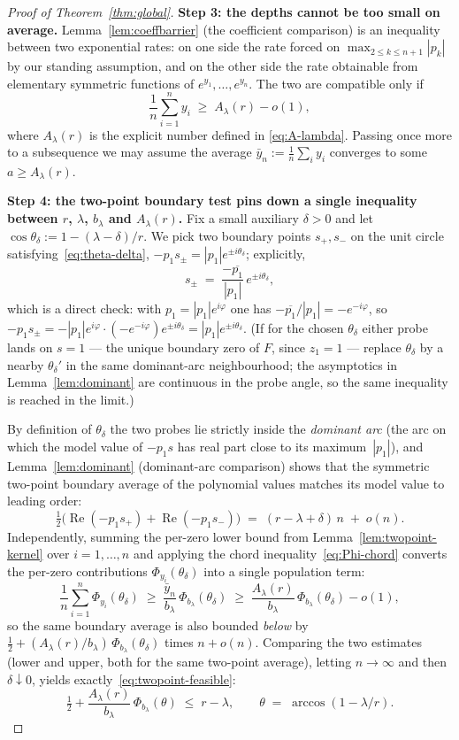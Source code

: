 \documentclass[11pt]{article}
\DeclareMathOperator{\Repart}{Re}
\begin{document}
\begin{proof}[Proof of Theorem~\ref{thm:global}]
\medskip
\noindent\textbf{Step 3: the depths cannot be too small on average.}
Lemma~\ref{lem:coeffbarrier} (the coefficient comparison) is an inequality
between two exponential rates: on one side the rate forced on
$\max_{2\leq k\leq n+1}|p_k|$ by our standing assumption, and on the other
side the rate obtainable from elementary symmetric functions of
$e^{y_1},\dots,e^{y_n}$. The two are compatible only if
\[
        \frac{1}{n}\sum_{i=1}^n y_i\;\geq\; A_\lambda(r)-o(1),
\]
where $A_\lambda(r)$ is the explicit number defined in
\eqref{eq:A-lambda}. Passing once more to a subsequence we may assume the
average $\bar y_n:=\tfrac1n\sum_i y_i$ converges to some $a\geq
A_\lambda(r)$.

\medskip
\noindent\textbf{Step 4: the two-point boundary test pins down a single
inequality between $r$, $\lambda$, $b_\lambda$ and $A_\lambda(r)$.}
Fix a small auxiliary $\delta>0$ and let
$\cos\theta_\delta:=1-(\lambda-\delta)/r$. We pick two boundary points
$s_+,s_-$ on the unit circle satisfying~\eqref{eq:theta-delta},
\(-p_1 s_\pm=|p_1|e^{\pm i\theta_\delta}\); explicitly,
\[
        s_\pm\;=\;\frac{-\overline{p_1}}{|p_1|}\,e^{\pm i\theta_\delta},
\]
which is a direct check: with $p_1=|p_1|e^{i\varphi}$ one has
$-\overline{p_1}/|p_1|=-e^{-i\varphi}$, so
$-p_1 s_\pm = -|p_1|e^{i\varphi}\cdot(-e^{-i\varphi})e^{\pm i\theta_\delta}
=|p_1|e^{\pm i\theta_\delta}$. (If for the chosen
$\theta_\delta$ either probe lands on $s=1$ --- the unique boundary zero of
$F$, since $z_1=1$ --- replace $\theta_\delta$ by a nearby $\theta_\delta'$
in the same dominant-arc neighbourhood; the asymptotics in
Lemma~\ref{lem:dominant} are continuous in the probe angle, so the same
inequality is reached in the limit.)

By definition of $\theta_\delta$ the two probes lie strictly inside the
\emph{dominant arc} (the arc on which the model value of $-p_1 s$ has real
part close to its maximum~$|p_1|$), and
Lemma~\ref{lem:dominant} (dominant-arc comparison) shows that the
symmetric two-point boundary average of the polynomial values matches its
model value to leading order:
\[
        \tfrac12\bigl(\Repart(-p_1s_+)+\Repart(-p_1s_-)\bigr)
        \;=\;(r-\lambda+\delta)\,n\;+\;o(n).
\]
Independently, summing the per-zero lower bound from
Lemma~\ref{lem:twopoint-kernel} over $i=1,\dots,n$ and applying the chord
inequality~\eqref{eq:Phi-chord} converts the per-zero contributions
$\Phi_{y_i}(\theta_\delta)$ into a single population term:
\[
        \frac{1}{n}\sum_{i=1}^n\Phi_{y_i}(\theta_\delta)
        \;\geq\;\frac{\bar y_n}{b_\lambda}\,
                \Phi_{b_\lambda}(\theta_\delta)
        \;\geq\;\frac{A_\lambda(r)}{b_\lambda}\,
                \Phi_{b_\lambda}(\theta_\delta)-o(1),
\]
so the same boundary average is also bounded \emph{below} by
$\tfrac12+(A_\lambda(r)/b_\lambda)\,\Phi_{b_\lambda}(\theta_\delta)$ times
$n+o(n)$. Comparing the two estimates (lower and upper, both for the same
two-point average), letting $n\to\infty$ and then $\delta\downarrow0$,
yields exactly~\eqref{eq:twopoint-feasible}:
\[
        \tfrac12+\frac{A_\lambda(r)}{b_\lambda}\,
                \Phi_{b_\lambda}(\theta)
        \;\leq\; r-\lambda,
        \qquad
        \theta\;=\;\arccos(1-\lambda/r).
\]


\end{proof}
\end{document}
